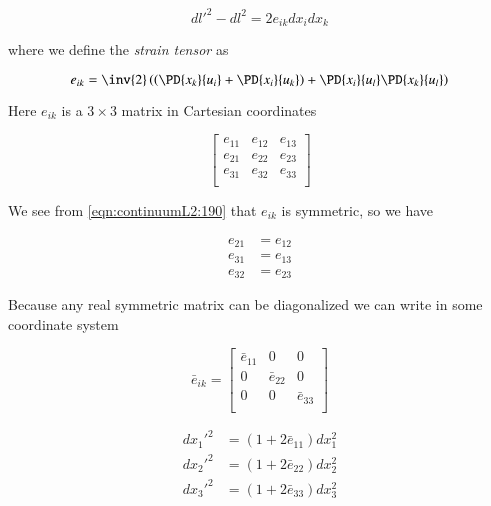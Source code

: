 \begin{equation}\label{eqn:continuumL2:170}
{dl'}^2 - dl^2 = 2 e_{ik} dx_i dx_k
\end{equation}

where we define the \emph{strain tensor} as

\begin{equation}\label{eqn:continuumL2:190}
e_{ik} = \inv{2} \left(
\left(
\PD{x_k}{u_i} 
+
\PD{x_i}{u_k} 
\right)
+ \PD{x_i}{u_l} 
\PD{x_k}{u_l} 
\right)
\end{equation}

Here $e_{ik}$ is a $3 \times 3$ matrix in Cartesian coordinates

\begin{equation}\label{eqn:continuumL2:210}
\begin{bmatrix}
e_{11} & e_{12} & e_{13} \\
e_{21} & e_{22} & e_{23} \\
e_{31} & e_{32} & e_{33} \\
\end{bmatrix}
\end{equation}

We see from \ref{eqn:continuumL2:190} that $e_{ik}$ is symmetric, so we have

\begin{align}\label{eqn:continuumL2:230}
e_{21} &= e_{12} \\
e_{31} &= e_{13} \\
e_{32} &= e_{23}
\end{align}

Because any real symmetric matrix can be diagonalized we can write in some coordinate system

\begin{equation}\label{eqn:continuumL2:250}
\bar{e}_{ik} = 
\begin{bmatrix}
\bar{e}_{11} & 0 & 0 \\
0 & \bar{e}_{22} & 0 \\
0 & 0 & \bar{e}_{33} \\
\end{bmatrix}
\end{equation}

\begin{align}\label{eqn:continuumL2:270}
{dx_1'}^2 &= (1 + 2 \bar{e}_{11}) dx_1^2 \\
{dx_2'}^2 &= (1 + 2 \bar{e}_{22}) dx_2^2 \\
{dx_3'}^2 &= (1 + 2 \bar{e}_{33}) dx_3^2
\end{align}

